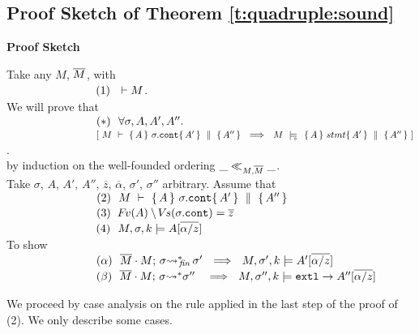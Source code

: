 \subsection{Proof Sketch of Theorem \ref{t:quadruple:sound} }
\label{s:app:proof:sketch;quadruples}
\noindent
\vspace{.2cm}
  {\textbf{Proof Sketch}} 


\noindent
Take any $M$, $\overline{M}$, with\\ 
$\strut \ \ \hspace{2.3cm} \ \ (1) \ \ \vdash M $.
\\
We will prove that\\
$\strut \ \ \hspace{2.3cm} \ \ (*)\ \ \forall \sigma, A, A', A''.$\\
$\strut \ \ \hspace{2.3cm} \ \ \ \ \  \ \ [ \ M\ \vdash\  \quadruple {A} {\sigma.\prg{cont}} {A'} {A''}  \ \ \Longrightarrow \ \    M\ \modelsD\  \quadruple {A} {stmt} {A'} {A''}\ ]$.\\
by induction on the well-founded ordering  $\_ \ll_{M,\overline{M}}  \_$.
\\
Take $\sigma$, $A$, $A'$, $A''$, $\overline z$, $\overline \alpha$, $\sigma'$, $\sigma''$  arbitrary. Assume that\\
$\strut \ \ \hspace{2.3cm} \ \ (2) \ \ M\ \vdash\  \quadruple {A} {\sigma.\prg{cont}} {A'} {A''}$\\
$\strut \ \ \hspace{2.3cm} \ \ (3) \ \ \fv(A)\setminus \vs(\sigma.\prg{cont} ) = \overline z$\\
$\strut \ \ \hspace{2.3cm} \ \ (4) \ \ \satDAssertFrom M  \sigma k   A[\overline{\alpha/z}]$\\
To show\\
$\strut \ \ \hspace{2.3cm} \ \ (\alpha) \ \    \leadstoBoundedStarFin {\Mtwo\cdot M}  {\sigma}  {\sigma'}\ \ \Longrightarrow\ \     \satDAssertFrom M  {\sigma'} k   A'[\overline{\alpha/z}]$\\
$\strut \ \ \hspace{2.3cm} \ \ (\beta) \ \    \leadstoBoundedStar  {\Mtwo\cdot M}  {\sigma}  {\sigma''}\ \ \ \Longrightarrow\ \     \satDAssertFrom M  {\sigma''}  k  \extThis \rightarrow A''[\overline{\alpha/z}]$
 
 \vspace{.2cm}
\noindent
We proceed by case analysis on the  rule applied in the last step of the proof of (2). We only describe some cases.

